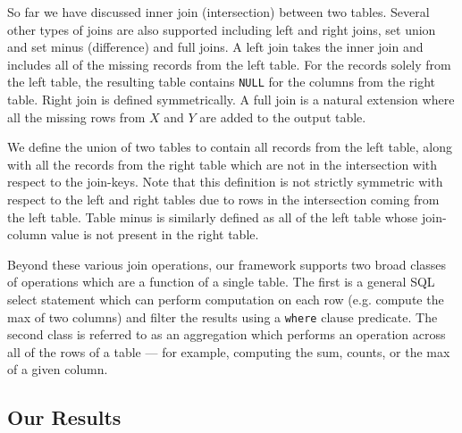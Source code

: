 \iffullversion
So far we have discussed inner join (intersection) between two tables. 
\fi
Several other types of joins are also supported including left and right joins, set union and set minus (difference) and full joins. A left join takes the inner join and includes all of the missing records from the left table. For the records solely from the left table, the resulting table contains \texttt{NULL} for the columns from the right table. Right join is defined symmetrically. A full join is a natural extension where all the missing rows from $X$ and $Y$ are added to the output table.

We define the union of two tables to contain all records from the left table, along with all the records from the right table which are not in the intersection with respect to the join-keys. Note that this definition is not strictly symmetric with respect to the left and right tables due to rows in the intersection coming from the left table. %
Table minus is similarly defined as all of the left table whose join-column value is not present in the right table. 

Beyond these various join operations, our framework supports two broad classes of operations which are a function of a single table. The first is a general SQL select statement which can perform computation on each row (e.g. compute the max of two columns) and filter the results using a \texttt{where} clause predicate. The second class is referred to as an aggregation which performs an operation across all of the rows of a table --- for example, computing the sum, counts, or the max of a given column. 
\subsection{Our Results}

